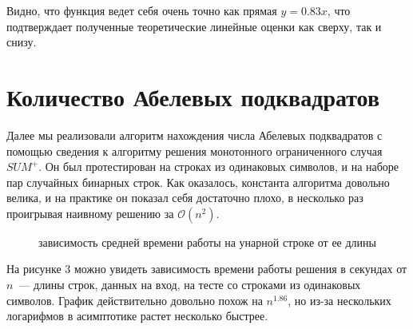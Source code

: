 Видно, что функция ведет себя очень точно как прямая $y=0.83x$, что подтверждает полученные теоретические линейные оценки как сверху, так и снизу.


\section{Количество Абелевых подквадратов}

Далее мы реализовали алгоритм нахождения числа Абелевых подквадратов с помощью сведения к алгоритму решения монотонного ограниченного случая $SUM^+$. Он был протестирован на строках из одинаковых символов, и на наборе пар случайных бинарных строк. Как оказалось, константа алгоритма довольно велика, и на практике он показал себя достаточно плохо, в несколько раз проигрывая наивному решению за $\mathcal{O}(n^2)$.

\begin{figure}[h]
\caption{зависимость средней времени работы на унарной строке от ее длины}
\end{figure}

На рисунке 3 можно увидеть зависимость времени работы решения в секундах от $n$~--- длины строк, данных на вход, на тесте со строками из одинаковых символов. График действительно довольно похож на $n^{1.86}$, но из-за нескольких логарифмов в асимптотике растет несколько быстрее. 


